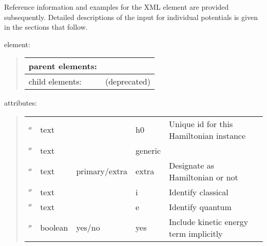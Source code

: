 \documentclass[letterpaper,10pt,english]{sphinxmanual}
\begin{document}
Reference information and examples for the  XML
element are provided subsequently. Detailed descriptions of the input
for individual potentials is given in the sections that follow.

 element:
\begin{quote}


\begin{savenotes}\sphinxattablestart
\centering
\begin{tabulary}{\linewidth}[t]{|T|T|}
\hline

parent elements:
&
\\
\hline
child elements:
&
 (deprecated)
\\
\hline
\end{tabulary}
\par
\sphinxattableend\end{savenotes}
\end{quote}

attributes:
\begin{quote}


\begin{savenotes}\sphinxattablestart
\centering
\begin{tabulary}{\linewidth}[t]{|T|T|T|T|T|}
\hline
\sphinxstyletheadfamily 
{}
&\sphinxstyletheadfamily 
{}
&\sphinxstyletheadfamily 
{}
&\sphinxstyletheadfamily 
{}
&\sphinxstyletheadfamily 
{}
\\
\hline
{}\(^o\)
&
text
&
&
h0
&
Unique id for this Hamiltonian instance
\\
\hline
{}\(^o\)
&
text
&&
generic
&
\\
\hline
{}\(^o\)
&
text
&
primary/extra
&
extra
&
Designate as Hamiltonian or not
\\
\hline
{}\(^o\)
&
text
&
&
i
&
Identify classical 
\\
\hline
{}\(^o\)
&
text
&
&
e
&
Identify quantum 
\\
\hline
{}\(^o\)
&
boolean
&
yes/no
&
yes
&
Include kinetic energy term implicitly
\\
\hline
\end{tabulary}
\par
\sphinxattableend\end{savenotes}
\end{quote}
\end{document}
